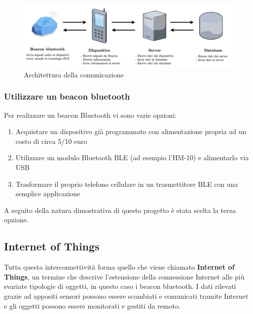 \begin{center}
\begin{figure}[htp]
    \centering
    \includegraphics[width=15cm]{diagrams/diagramma_comunicazione.png}
    \caption{Architettura della comunicazione}
    \label{fig:architettura_comunicazione}
\end{figure}
\end{center}

\subsubsection{Utilizzare un beacon bluetooth}
Per realizzare un beacon Bluetooth vi sono varie opzioni:
\begin{enumerate}
    \item Acquistare un dispositivo già programmato con alimentazione propria ad un costo di circa 5/10 euro
    \item Utilizzare un modulo Bluetooth BLE (ad esempio l'HM-10) e alimentarlo via USB
    \item Trasformare il proprio telefono cellulare in un trasmettitore BLE con una semplice applicazione
\end{enumerate}

A seguito della natura dimostrativa di questo progetto è stata scelta la terza opzione.

\subsection{Internet of Things} Tutta questa interconnettività forma quello che viene chiamato \textbf{Internet of Things}, un termine che descrive l'estensione della connessione Internet alle più svariate tipologie di oggetti, in questo caso i beacon bluetooth. I dati rilevati grazie ad appositi sensori possono essere scambiati e comunicati tramite Internet e gli oggetti possono essere monitorati e gestiti da remoto.




